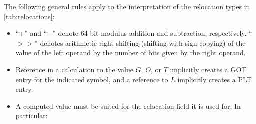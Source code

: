 \documentclass[USenglish,fontsize=11pt,twoside,%
  toc=bib,toc=idx,toc=graduated,numbers=noendperiod,
  bookmarks=true,
  bookmarksnumbered=true,
  bookmarksopen=true,
  bookmarksopenlevel=1,
  breaklinks=true,
  colorlinks=true,
  linkcolor=black,
  pdfpagelayout={TwoPageRight},
  pdfusetitle=true
]{scrreprt}
\newcommand{\NBITS}{64}
\newcommand{\NBITS}{32}
\begin{document}
The following general rules apply to the interpretation of the relocation
types in \cref{tab:relocations}:

\begin{itemize}
\item ``$+$'' and ``$-$'' denote \NBITS{}-bit modulus addition and
  subtraction, respectively.  ``$>>$'' denotes arithmetic right-shifting
  (shifting with sign copying) of the value of the left operand by the
  number of bits given by the right operand.
\item Reference in a calculation to the value $G$, $O$, or $T$ implicitly
  creates a GOT entry for the indicated symbol, and a reference to $L$
  implicitly creates a PLT entry.
\item A computed value must be suited for the relocation field it is used
  for.  In particular:
\end{itemize}
\end{document}
